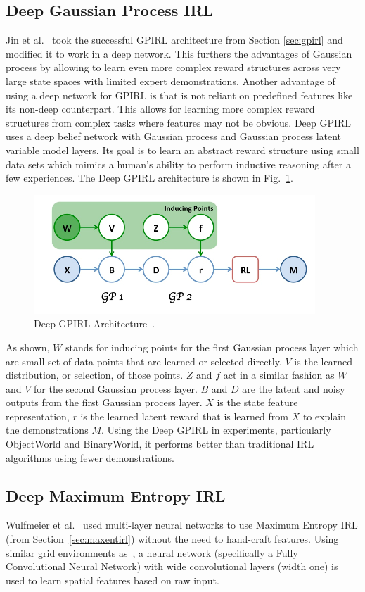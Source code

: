 \documentclass[12pt,american]{report}
\begin{document}
\subsection{Deep Gaussian Process IRL}
Jin et al.~\cite{jin2015inverse} took the successful GPIRL architecture from Section \ref{sec:gpirl} and modified it to work in a deep network. This furthers the advantages of Gaussian process by allowing to learn even more complex reward structures across very large state spaces with limited expert demonstrations. Another advantage of using a deep network for GPIRL is that is not reliant on predefined features like its non-deep counterpart.  This allows for learning more complex reward structures from complex tasks where features may not be obvious.  Deep GPIRL uses a deep belief network with Gaussian process and Gaussian process latent variable model layers. Its goal is to learn an abstract reward structure using small data sets which mimics a human's ability to perform inductive reasoning after a few experiences. The Deep GPIRL architecture is shown in Fig.~\ref{fig:dgpirl-arch}.
\begin{figure}
\centering
\includegraphics[scale=1.5]{images/dgpirl-arch.png}
\caption{Deep GPIRL Architecture~\cite{jin2015inverse}.}
\label{fig:dgpirl-arch}
\end{figure}
 As shown, $W$ stands for inducing points for the first Gaussian process layer which are small set of data points that are learned or selected directly. $V$ is the learned distribution, or selection, of those points.  $Z$ and $f$ act in a similar fashion as $W$ and $V$ for the second Gaussian process layer. $B$ and $D$ are the latent and noisy outputs from the first Gaussian process layer. $X$ is the state feature representation, $r$ is the learned latent reward that is learned from $X$ to explain the demonstrations $M$.  Using the Deep GPIRL in experiments, particularly ObjectWorld and BinaryWorld, it performs better than traditional IRL algorithms using fewer demonstrations. 

\label{sec:maxentdeepirl}
\subsection{Deep Maximum Entropy IRL}
Wulfmeier et al.~\cite{wulfmeier2015maximum} used multi-layer neural networks to use Maximum Entropy IRL (from Section~\ref{sec:maxentirl}) without the need to hand-craft features. Using similar grid environments as~\cite{ziebart2008maximum}, a neural network (specifically a Fully Convolutional Neural Network) with wide convolutional layers (width one) is used to learn spatial features based on raw input.  
\end{document}
